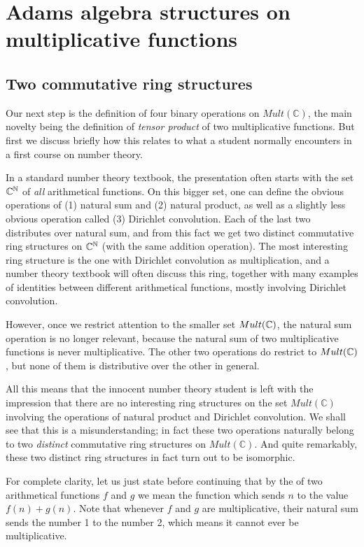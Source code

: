 
\section{Adams algebra structures on multiplicative functions}

\subsection{Two commutative ring structures}

Our next step is the definition of four binary operations on $Mult(\mathbb{C})$, the main novelty being the definition of \emph{tensor product} of two multiplicative functions. But first we discuss briefly how this relates to what a student normally encounters in a first course on number theory.

In a standard number theory textbook, the presentation often starts with the set $\mathbb{C}^{\mathbb{N}}$ of \emph{all} arithmetical functions. On this bigger set, one can define the obvious operations of (1) natural sum and (2) natural product, as well as a slightly less obvious operation called (3) Dirichlet convolution. Each of the last two distributes over natural sum, and from this fact we get two distinct commutative ring structures on $\mathbb{C}^{\mathbb{N}}$ (with the same addition operation). The most interesting ring structure is the one with Dirichlet convolution as multiplication, and a number theory textbook will often discuss this ring, together with many examples of identities between different arithmetical functions, mostly involving Dirichlet convolution.

However, once we restrict attention to the smaller set $Mult(\mathbb{C})$, the natural sum operation is no longer relevant, because the natural sum of two multiplicative functions is never multiplicative. The other two operations do restrict to $Mult(\mathbb{C})$, but none of them is distributive over the other in general. 

All this means that the innocent number theory student is left with the impression that there are no interesting ring structures on the set $Mult(\mathbb{C})$ involving the operations of natural product and Dirichlet convolution. We shall see that this is a misunderstanding; in fact these two operations naturally belong to two \emph{distinct} commutative ring structures on $Mult(\mathbb{C})$. And quite remarkably, these two distinct ring structures in fact turn out to be isomorphic.

\begin{remark}
For complete clarity, let us just state before continuing that by the  of two arithmetical functions $f$ and $g$ we mean the function which sends $n$ to the value $f(n)+g(n)$. Note that whenever $f$ and $g$ are multiplicative, their natural sum sends the number 1 to the number 2, which means it cannot ever be multiplicative.
\end{remark}

